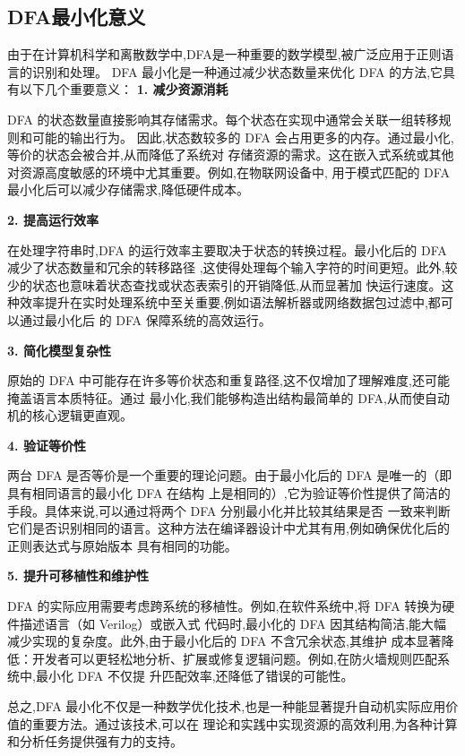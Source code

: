 \documentclass{article}
\begin{document}
\subsection{DFA最小化意义}

由于在计算机科学和离散数学中,DFA是一种重要的数学模型,被广泛应用于正则语言的识别和处理。
DFA 最小化是一种通过减少状态数量来优化 DFA 的方法,它具有以下几个重要意义： 
\textbf{1. 减少资源消耗}

DFA 的状态数量直接影响其存储需求。每个状态在实现中通常会关联一组转移规则和可能的输出行为。
因此,状态数较多的 DFA 会占用更多的内存。通过最小化,等价的状态会被合并,从而降低了系统对
存储资源的需求。这在嵌入式系统或其他对资源高度敏感的环境中尤其重要。例如,在物联网设备中,
用于模式匹配的 DFA 最小化后可以减少存储需求,降低硬件成本。

\textbf{2. 提高运行效率}

在处理字符串时,DFA 的运行效率主要取决于状态的转换过程。最小化后的 DFA 减少了状态数量和冗余的转移路径
,这使得处理每个输入字符的时间更短。此外,较少的状态也意味着状态查找或状态表索引的开销降低,从而显著加
快运行速度。这种效率提升在实时处理系统中至关重要,例如语法解析器或网络数据包过滤中,都可以通过最小化后
的 DFA 保障系统的高效运行。

\textbf{3. 简化模型复杂性}

原始的 DFA 中可能存在许多等价状态和重复路径,这不仅增加了理解难度,还可能掩盖语言本质特征。通过
最小化,我们能够构造出结构最简单的 DFA,从而使自动机的核心逻辑更直观。

\textbf{4. 验证等价性}

两台 DFA 是否等价是一个重要的理论问题。由于最小化后的 DFA 是唯一的（即具有相同语言的最小化 DFA 在结构
上是相同的）,它为验证等价性提供了简洁的手段。具体来说,可以通过将两个 DFA 分别最小化并比较其结果是否
一致来判断它们是否识别相同的语言。这种方法在编译器设计中尤其有用,例如确保优化后的正则表达式与原始版本
具有相同的功能。

\textbf{5. 提升可移植性和维护性}

DFA 的实际应用需要考虑跨系统的移植性。例如,在软件系统中,将 DFA 转换为硬件描述语言（如 Verilog）或嵌入式
代码时,最小化的 DFA 因其结构简洁,能大幅减少实现的复杂度。此外,由于最小化后的 DFA 不含冗余状态,其维护
成本显著降低：开发者可以更轻松地分析、扩展或修复逻辑问题。例如,在防火墙规则匹配系统中,最小化 DFA 不仅提
升匹配效率,还降低了错误的可能性。

 总之,DFA 最小化不仅是一种数学优化技术,也是一种能显著提升自动机实际应用价值的重要方法。通过该技术,可以在
 理论和实践中实现资源的高效利用,为各种计算和分析任务提供强有力的支持。
\end{document}
